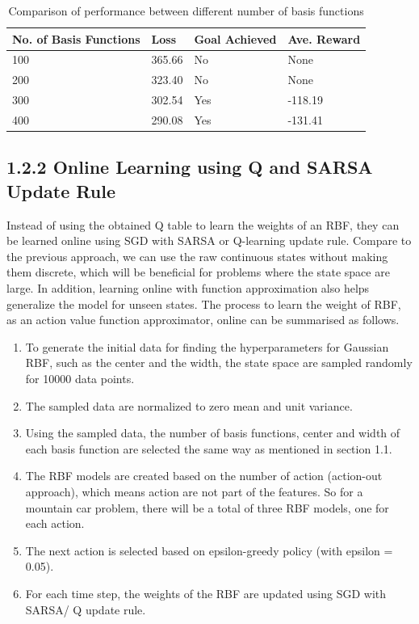 \documentclass[12pt,letterpaper]{article}
\newenvironment{myitemize}
{ \begin{enumerate}
    \setlength{\itemsep}{1pt}
    \setlength{\parskip}{1pt}
    \setlength{\parsep}{1pt}     }
{ \end{enumerate}         }
\begin{document}
\begin{table}[htb]
  \centering
  \begin{tabular}{l p{1.2cm} p{3cm} p{3cm}}
  \toprule
     No. of Basis Functions & Loss & Goal Achieved & Ave. Reward\\ \midrule
  100 & 365.66 & No & None    \\ 
  200 & 323.40 & No & None   \\ 
  300 & 302.54 & Yes & -118.19   \\ 
  400 & 290.08 & Yes & -131.41   \\ 
  \bottomrule
\end{tabular}
\caption{Comparison of performance between different number of basis functions}
\label{rbf-accuracy}
\end{table}

\subsection*{1.2.2 Online Learning using Q and SARSA Update Rule}

Instead of using the obtained Q table to learn the weights of an RBF, they can be learned online using SGD with SARSA or Q-learning update rule.
Compare to the previous approach, we can use the raw continuous states without making them discrete, 
which will be beneficial for problems where the state space are large. 
In addition, learning online with function approximation also helps generalize the model for unseen states.
The process to learn the weight of RBF, as an action value function approximator, online can be summarised as follows.

\begin{myitemize}
  \item To generate the initial data for finding the hyperparameters for Gaussian RBF, such as the center and the width, 
  the state space are sampled randomly for 10000 data points.
  \item The sampled data are normalized to zero mean and unit variance.
  \item Using the sampled data, the number of basis functions, center and width of each basis function are selected the same way as mentioned in section 1.1.
  \item The RBF models are created based on the number of action (action-out approach), which means action are not part of the features.
  So for a mountain car problem, there will be a total of three RBF models, one for each action.
  \item The next action is selected based on epsilon-greedy policy (with epsilon = 0.05).
  \item For each time step, the weights of the RBF are updated using SGD with SARSA/ Q update rule.
\end{myitemize}  
\end{document}
